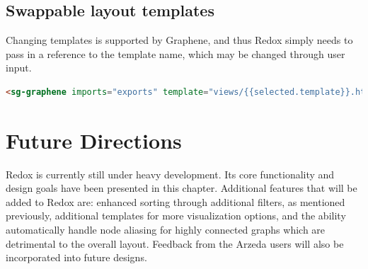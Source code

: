 \subsection{Swappable layout templates}
Changing templates is supported by Graphene, and thus Redox simply needs to pass in a reference to the template name, which may be changed through user input.

\begin{lstlisting}[language=html]
<sg-graphene imports="exports" template="views/{{selected.template}}.html"></sg-graphene>
\end{lstlisting}

\section{Future Directions}
Redox is currently still under heavy development.
Its core functionality and design goals have been presented in this chapter.
Additional features that will be added to Redox are: enhanced sorting through additional filters, as mentioned previously, additional templates for more visualization options, and the ability automatically handle node aliasing for highly connected graphs which are detrimental to the overall layout.
Feedback from the Arzeda users will also be incorporated into future designs.

